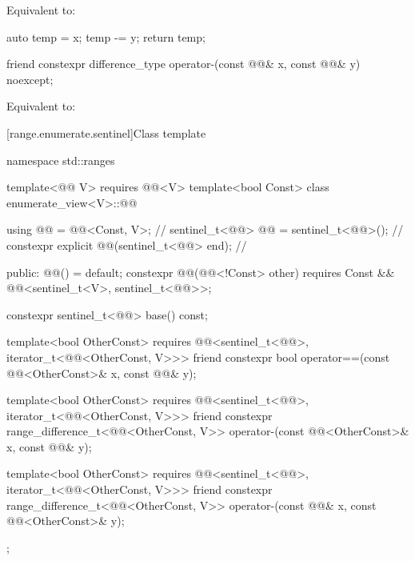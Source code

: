 \begin{itemdescr}
\pnum
\effects
Equivalent to:
\begin{codeblock}
auto temp = x;
temp -= y;
return temp;
\end{codeblock}
\end{itemdescr}

%
\begin{itemdecl}
friend constexpr difference_type operator-(const @@& x, const @@& y) noexcept;
\end{itemdecl}

\begin{itemdescr}
\pnum
\effects
Equivalent to: 
\end{itemdescr}

[range.enumerate.sentinel]{Class template }

%
\begin{codeblock}
namespace std::ranges {
  template<@@ V>
    requires @@<V>
  template<bool Const>
  class enumerate_view<V>::@@ {
    using @@ = @@<Const, V>;                         // \expos
    sentinel_t<@@> @@ = sentinel_t<@@>();                 // \expos
    constexpr explicit @@(sentinel_t<@@> end);          // \expos

  public:
    @@() = default;
    constexpr @@(@@<!Const> other)
      requires Const && @@<sentinel_t<V>, sentinel_t<@@>>;

    constexpr sentinel_t<@@> base() const;

    template<bool OtherConst>
      requires @@<sentinel_t<@@>, iterator_t<@@<OtherConst, V>>>
    friend constexpr bool operator==(const @@<OtherConst>& x, const @@& y);

    template<bool OtherConst>
      requires @@<sentinel_t<@@>, iterator_t<@@<OtherConst, V>>>
    friend constexpr range_difference_t<@@<OtherConst, V>>
      operator-(const @@<OtherConst>& x, const @@& y);

    template<bool OtherConst>
      requires @@<sentinel_t<@@>, iterator_t<@@<OtherConst, V>>>
    friend constexpr range_difference_t<@@<OtherConst, V>>
      operator-(const @@& x, const @@<OtherConst>& y);
  };
}
\end{codeblock}

